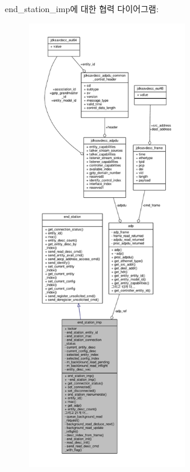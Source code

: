 end\+\_\+station\+\_\+imp에 대한 협력 다이어그램\+:
\nopagebreak
\begin{figure}[H]
\begin{center}
\leavevmode
\includegraphics[height=550pt]{classavdecc__lib_1_1end__station__imp__coll__graph}
\end{center}
\end{figure}
